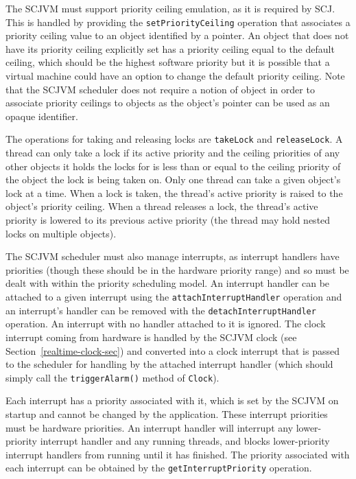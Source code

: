 \documentclass[a4paper,10pt]{report}
\begin{document}
The SCJVM must support priority ceiling emulation, as it is required by
SCJ. This is handled by providing the \texttt{set\-Priority\-Ceiling} operation
that associates a priority ceiling value to an object identified by a
pointer. An object that does not have its priority ceiling explicitly set has a
priority ceiling equal to the default ceiling, which should be the highest
software priority but it is possible that a virtual machine could have an option
to change the default priority ceiling. Note that the SCJVM scheduler does not
require a notion of object in order to associate priority ceilings to objects as
the object's pointer can be used as an opaque identifier.

The operations for taking and releasing locks are \texttt{takeLock} and
\texttt{releaseLock}. A thread can only take a lock if its active priority and
the ceiling priorities of any other objects it holds the locks for is less than
or equal to the ceiling priority of the object the lock is being taken on. Only
one thread can take a given object's lock at a time. When a lock is taken, the
thread's active priority is raised to the object's priority ceiling. When a
thread releases a lock, the thread's active priority is lowered to its previous
active priority (the thread may hold nested locks on multiple objects).

The SCJVM scheduler must also manage interrupts, as interrupt handlers have
priorities (though these should be in the hardware priority range) and so must
be dealt with within the priority scheduling model. An interrupt handler can be
attached to a given interrupt using the \texttt{attach\-Interrupt\-Handler}
operation and an interrupt's handler can be removed with the
\texttt{detach\-Interrupt\-Handler} operation. An interrupt with no handler
attached to it is ignored. The clock interrupt coming from hardware is handled
by the SCJVM clock (see Section~\ref{realtime-clock-sec}) and converted into a
clock interrupt that is passed to the scheduler for handling by the attached
interrupt handler (which should simply call the \texttt{triggerAlarm()} method
of \texttt{Clock}).

Each interrupt has a priority associated with it, which is set by the SCJVM on
startup and cannot be changed by the application. These interrupt priorities
must be hardware priorities. An interrupt handler will interrupt any
lower-priority interrupt handler and any running threads, and blocks
lower-priority interrupt handlers from running until it has finished. The
priority associated with each interrupt can be obtained by the
\texttt{get\-Interrupt\-Priority} operation.
\end{document}
